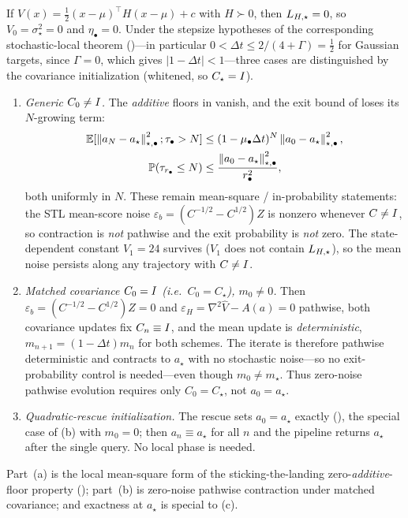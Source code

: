 \begin{corollary}
\label{cor:stoch-local-gauss}
If $V(x)=\tfrac12(x-\mu)^\top H(x-\mu)+c$ with $H\succ0$, then $L_{H,\star}=0$, so $V_0=\sigma_\star^2=0$ and
$\eta_\bullet=0$. Under the stepsize hypotheses of the corresponding stochastic-local theorem
()---in particular $0<\Delta t\leq2/(4+\Gamma)=\tfrac12$
for Gaussian targets, since $\Gamma=0$, which gives $|1-\Delta t|<1$---three cases are distinguished by
the covariance initialization (whitened, so $C_\star=I$).
\begin{enumerate}
\item[(a)] \emph{Generic $C_0\neq I$.} The \emph{additive} floors in
 vanish, and the exit bound of
 loses its $N$-growing term:
\[
    \begin{aligned}
    \mathbb{E}[\left\lVert a_N-a_\star\right\rVert_{\star,\bullet}^2;\tau_\bullet>N]&\leq(1-\mu_\bullet\Delta t)^N\left\lVert a_0-a_\star\right\rVert_{\star,\bullet}^2,\\
    \mathbb{P}(\tau_{r_\bullet}\leq N)&\leq\frac{\left\lVert a_0-a_\star\right\rVert_{\star,\bullet}^2}{r_\bullet^2},
    \end{aligned}
\]
both uniformly in $N$.
These remain mean-square / in-probability statements: the STL mean-score noise
$\varepsilon_b=(C^{-1/2}-C^{1/2})Z$ is nonzero whenever $C\neq I$, so contraction is \emph{not}
pathwise and the exit probability is \emph{not} zero. The state-dependent constant $V_1=24$ survives
($V_1$ does not contain $L_{H,\star}$), so the mean noise persists along any trajectory with $C\neq I$.
\item[(b)] \emph{Matched covariance $C_0=I$ (i.e.\ $C_0=C_\star$), $m_0\neq0$.} Then
$\varepsilon_b=(C^{-1/2}-C^{1/2})Z=0$ and $\varepsilon_H=\nabla^2\widehat V-A(a)=0$ pathwise, both
covariance updates fix $C_n\equiv I$, and the mean update is \emph{deterministic},
$m_{n+1}=(1-\Delta t)m_n$ for both schemes. The iterate is therefore pathwise deterministic and
contracts to $a_\star$ with no stochastic noise---so no exit-probability control is needed---even
though $m_0\neq m_\star$. Thus zero-noise pathwise evolution requires only $C_0=C_\star$, not
$a_0=a_\star$.
\item[(c)] \emph{Quadratic-rescue initialization.} The rescue sets $a_0=a_\star$ exactly
(), the special case of (b) with $m_0=0$; then $a_n\equiv a_\star$ for all $n$
and the pipeline returns $a_\star$ after the single query. No local phase is needed.
\end{enumerate}
Part~(a) is the local mean-square form of the sticking-the-landing zero-\emph{additive}-floor property
(); part~(b) is zero-noise pathwise contraction under matched covariance; and
exactness at $a_\star$ is special to (c).
\end{corollary}

